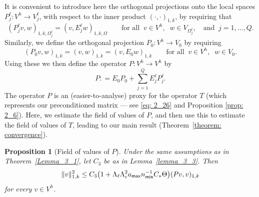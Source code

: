 \documentclass[numbers,webpdf,imaiai]{ima-authoring-template}%
\theoremstyle{thmstyletwo}%
\newtheorem{proposition}[theorem]{Proposition}%
\numberwithin{equation}{section}
\newcommand{\Cstar}{C_{\ast}}
\newcommand{\assign}{\mathrel{\mathop:}=}
\numberwithin{equation}{section}
\newcommand{\amax}{a_{\textup{\textsf{max}}}}
\newcommand{\nmin}{n_{\textup{\textsf{min}}}}
\begin{document}
{It is convenient to introduce here the orthogonal projections onto the local spaces ${P_j^\ell}: V^h \rightarrow V^\ell_j$, 
with respect to the inner product $(\cdot, \cdot)_{1,k}$, by requiring that
\begin{equation}
	(P_j^\ell v, w)_{1,k,\Omega^\ell_j} = (v, E_j^\ell w)_{1,k,\Omega} \qquad \text{for all}
	\;\; v \in V^h, \;\; w \in V_{\Omega_j^\ell},  \quad \text{and} \;\; j = 1, \ldots, Q 
	\label{eq: 3_10_nested}.
\end{equation}
Similarly, we  define the orthogonal projection $P_0 : V^h \rightarrow V_0$ by requiring 
\begin{equation}
	(P_0 v, w)_{1, k} = (v, w)_{1,k} =(v, E_0w)_{1,k} \qquad \text{for all} \;\; v \in V^h, \;\; w \in V_0. 
	\label{eq: 3_10_zero}
\end{equation}
Using these we then  define the operator $P: V^h \rightarrow V^h$ by
\begin{equation}
	P \assign E_0P_0 + \sum_{j=1}^{Q} {E_j^\ell} {P_j^\ell}. \label{eq: 3_11}
\end{equation} 
The operator $P$ is an (easier-to-analyse) proxy for the operator $T$ 
(which represents our preconditioned matrix --- see \eqref{eq: 2_26} and  Proposition \ref{prop: 2_6}). 
Here, we estimate the field of values of $P$, and then use this to estimate  the field of values of  $T$, 
leading to our main  result (Theorem~\ref{theorem: convergence}).

\begin{proposition}[Field of values of $P$] \label{prop:Puu}
Under the same assumptions as in Theorem~\ref{Lemma_3_1}, let $C_3$ be as in Lemma~\ref{lemma_3_3}.
Then 
\begin{equation}\label{eq: 3_12}
	\|v\|^2_{1,k} \le C_3\bigl(1 + \Lambda_\ell \Lambda_c^2 \amax \nmin^{-1} \Cstar \Theta \bigr) (Pv,v)_{1,k}
\end{equation}
for every $v\in V^h$.
\end{proposition}

}
\end{document}
